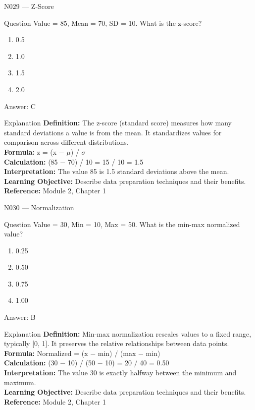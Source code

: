 \documentclass[aspectratio=169,8pt]{beamer}
\begin{document}
	\begin{frame}{N029 --- Z-Score}
		\begin{block}{Question}
			Value = 85, Mean = 70, SD = 10. What is the z-score?
			\begin{enumerate}
				\item 0.5
				\item 1.0
				\item 1.5
				\item 2.0
			\end{enumerate}
		\end{block}
		\begin{exampleblock}{Answer: C}\end{exampleblock}
		\begin{block}{Explanation}
			\textbf{Definition:} The z-score (standard score) measures how many standard deviations a value is from the mean. It standardizes values for comparison across different distributions.\\
			\textbf{Formula:} z = (x $-$ $\mu$) / $\sigma$\\
			\textbf{Calculation:} (85 $-$ 70) / 10 = 15 / 10 = 1.5\\
			\textbf{Interpretation:} The value 85 is 1.5 standard deviations above the mean.\\
			\textbf{Learning Objective:} Describe data preparation techniques and their benefits.\\
			\textbf{Reference:} Module 2, Chapter 1
		\end{block}
	\end{frame}
	
	\begin{frame}{N030 --- Normalization}
		\begin{block}{Question}
			Value = 30, Min = 10, Max = 50. What is the min-max normalized value?
			\begin{enumerate}
				\item 0.25
				\item 0.50
				\item 0.75
				\item 1.00
			\end{enumerate}
		\end{block}
		\begin{exampleblock}{Answer: B}\end{exampleblock}
		\begin{block}{Explanation}
			\textbf{Definition:} Min-max normalization rescales values to a fixed range, typically [0, 1]. It preserves the relative relationships between data points.\\
			\textbf{Formula:} Normalized = (x $-$ min) / (max $-$ min)\\
			\textbf{Calculation:} (30 $-$ 10) / (50 $-$ 10) = 20 / 40 = 0.50\\
			\textbf{Interpretation:} The value 30 is exactly halfway between the minimum and maximum.\\
			\textbf{Learning Objective:} Describe data preparation techniques and their benefits.\\
			\textbf{Reference:} Module 2, Chapter 1
		\end{block}
	\end{frame}
	
\end{document}

